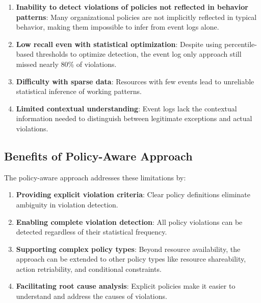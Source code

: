 \begin{enumerate}
    \item \textbf{Inability to detect violations of policies not reflected in behavior patterns}: Many organizational policies are not implicitly reflected in typical behavior, making them impossible to infer from event logs alone.
    
    \item \textbf{Low recall even with statistical optimization}: Despite using percentile-based thresholds to optimize detection, the event log only approach still missed nearly 80\% of violations.
    
    \item \textbf{Difficulty with sparse data}: Resources with few events lead to unreliable statistical inference of working patterns.
    
    \item \textbf{Limited contextual understanding}: Event logs lack the contextual information needed to distinguish between legitimate exceptions and actual violations.
\end{enumerate}

\subsection{Benefits of Policy-Aware Approach}

The policy-aware approach addresses these limitations by:

\begin{enumerate}
    \item \textbf{Providing explicit violation criteria}: Clear policy definitions eliminate ambiguity in violation detection.
    
    \item \textbf{Enabling complete violation detection}: All policy violations can be detected regardless of their statistical frequency.
    
    \item \textbf{Supporting complex policy types}: Beyond resource availability, the approach can be extended to other policy types like resource shareability, action retriability, and conditional constraints.
    
    \item \textbf{Facilitating root cause analysis}: Explicit policies make it easier to understand and address the causes of violations.
\end{enumerate}

